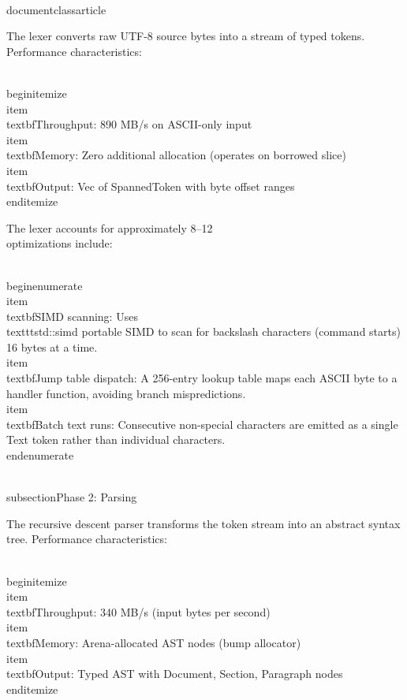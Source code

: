 \\documentclass{article}
\begin{document}
The lexer converts raw UTF-8 source bytes into a stream of typed tokens.
Performance characteristics:

\\begin{itemize}
  \\item \\textbf{Throughput}: 890 MB/s on ASCII-only input
  \\item \\textbf{Memory}: Zero additional allocation (operates on borrowed slice)
  \\item \\textbf{Output}: Vec of SpannedToken with byte offset ranges
\\end{itemize}

The lexer accounts for approximately 8--12\\%
optimizations include:

\\begin{enumerate}
  \\item \\textbf{SIMD scanning}: Uses \\texttt{std::simd} portable SIMD
    to scan for backslash characters (command starts) 16 bytes at a time.
  \\item \\textbf{Jump table dispatch}: A 256-entry lookup table maps each
    ASCII byte to a handler function, avoiding branch mispredictions.
  \\item \\textbf{Batch text runs}: Consecutive non-special characters are
    emitted as a single Text token rather than individual characters.
\\end{enumerate}

\\subsection{Phase 2: Parsing}

The recursive descent parser transforms the token stream into an abstract
syntax tree. Performance characteristics:

\\begin{itemize}
  \\item \\textbf{Throughput}: 340 MB/s (input bytes per second)
  \\item \\textbf{Memory}: Arena-allocated AST nodes (bump allocator)
  \\item \\textbf{Output}: Typed AST with Document, Section, Paragraph nodes
\\end{itemize}
\end{document}
